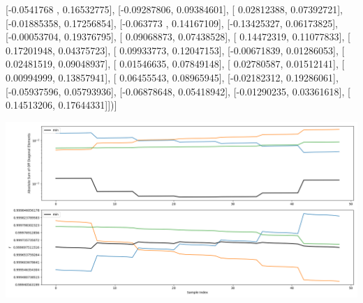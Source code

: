 \documentclass{article}
\begin{document}
       [-0.0541768 ,  0.16532775],
       [-0.09287806,  0.09384601],
       [ 0.02812388,  0.07392721],
       [-0.01885358,  0.17256854],
       [-0.063773  ,  0.14167109],
       [-0.13425327,  0.06173825],
       [-0.00053704,  0.19376795],
       [ 0.09068873,  0.07438528],
       [ 0.14472319,  0.11077833],
       [ 0.17201948,  0.04375723],
       [ 0.09933773,  0.12047153],
       [-0.00671839,  0.01286053],
       [ 0.02481519,  0.09048937],
       [ 0.01546635,  0.07849148],
       [ 0.02780587,  0.01512141],
       [ 0.00994999,  0.13857941],
       [ 0.06455543,  0.08965945],
       [-0.02182312,  0.19286061],
       [-0.05937596,  0.05793936],
       [-0.06878648,  0.05418942],
       [-0.01290235,  0.03361618],
       [ 0.14513206,  0.17644331]])]
\begin{center}
\includegraphics[scale=.9]{report_pickled_controls155/control_dpn_all.png}

\end{center}
\end{document}
